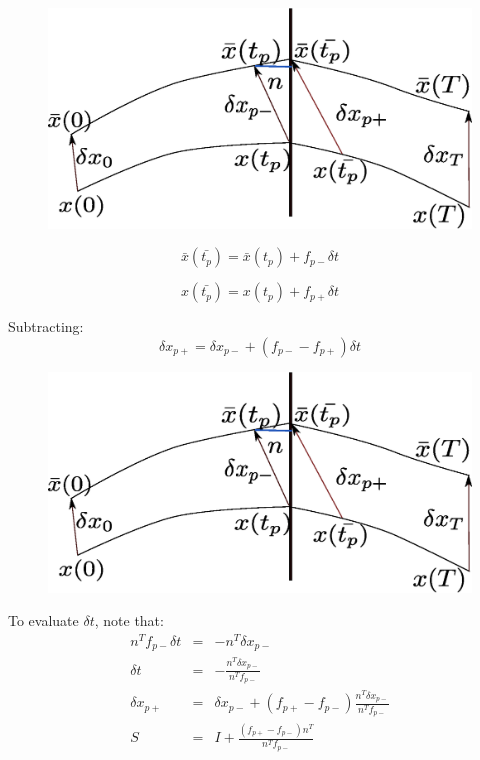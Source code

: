 \documentclass[xcolor=x11names,compress]{beamer}
\renewcommand{\(}{\begin{columns}}
\renewcommand{\)}{\end{columns}}
\newcommand{\<}[1]{\begin{column}{#1}}
\renewcommand{\>}{\end{column}}
\begin{document}
\begin{frame}
\begin{figure}
\begin{center}
\includegraphics[width=0.6\columnwidth]{saltation}
\end{center}
\end{figure}

\begin{equation}
\label{eq-salt-barx}
\bar{x}(\bar{t_p})=\bar{x}(t_p)+f_{p-}\delta t
\end{equation}

\begin{equation}
\label{eq-salt-x}
x(\bar{t_p})=x(t_p)+f_{p+}\delta t
\end{equation}

Subtracting:
\begin{equation}
\delta x_{p+}=\delta x_{p-}+(f_{p-}-f_{p+})\delta t
\end{equation}
\end{frame}

\begin{frame}
\begin{figure}
\begin{center}
\includegraphics[width=0.6\columnwidth]{saltation}
\end{center}
\end{figure}

To evaluate $\delta t$, note that:
\begin{eqnarray}
n^Tf_{p-}\delta t&=&-n^T\delta x_{p-}\\
\delta t&=&-\frac{n^T\delta x_{p-}}{n^Tf_{p-}} \\
\delta x_{p+}&=&\delta x_{p-}+(f_{p+}-f_{p-})\frac{n^T\delta x_{p-}}{n^Tf_{p-}}\\
S&=&I+\frac{(f_{p+}-f_{p-})n^T}{n^Tf_{p-}}
\end{eqnarray}

\end{frame}
\end{document}
